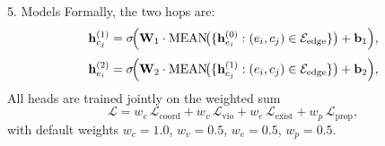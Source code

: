 \documentclass[final]{beamer}
\newlength{\colwidth}
\begin{document}
\begin{frame}[t]
\begin{columns}[t]
\begin{column}{\colwidth}
\begin{block}{5. Models}
    Formally, the two hops are:
    \begin{equation*}
      \mathbf{h}_{c_j}^{(1)} = \sigma\!\Bigl(\mathbf{W}_1 \cdot
      \operatorname{MEAN}\!\bigl(\{\mathbf{h}_{e_i}^{(0)}: (e_i,c_j)\in
      \mathcal{E}_{\text{edge}}\}\bigr) + \mathbf{b}_1\Bigr),
    \end{equation*}
    \begin{equation*}
      \mathbf{h}_{e_i}^{(2)} = \sigma\!\Bigl(\mathbf{W}_2 \cdot
      \operatorname{MEAN}\!\bigl(\{\mathbf{h}_{c_j}^{(1)}: (e_i,c_j)\in
      \mathcal{E}_{\text{edge}}\}\bigr) + \mathbf{b}_2\Bigr),
    \end{equation*}
    All heads are trained jointly on the weighted sum
    \begin{equation*}
      \mathcal{L} = w_c\,\mathcal{L}_{\text{coord}} + w_v\,\mathcal{L}_{\text{vio}}
      + w_e\,\mathcal{L}_{\text{exist}} + w_p\,\mathcal{L}_{\text{prop}},
    \end{equation*}
    with default weights $w_c{=}1.0$, $w_v{=}0.5$, $w_e{=}0.5$, $w_p{=}0.5$.


\end{block}
\end{column}
\end{columns}
\end{frame}
\end{document}
